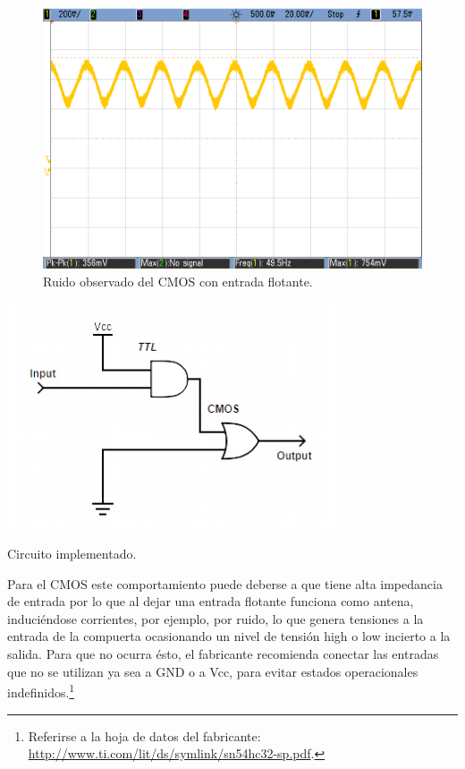 \begin{figure}[H]
    \centering
    \includegraphics[width=.5\linewidth]{./ruidoCMOS.png}
    \caption{Ruido observado del CMOS con entrada flotante.}
    \label{fig:ruidoCMOS}
\end{figure}

\vspace{20mm}
\begin{table}
    \begin{center}
        \includegraphics[scale=0.5]{./circuito.jpg}
        \caption{Circuito implementado.}
        \label{fig:circuito}
    \end{center}
\end{table} 
\par
Para el CMOS este comportamiento puede deberse a que tiene alta impedancia de entrada por lo que al dejar una entrada flotante
funciona como antena, induciéndose corrientes, por ejemplo, por ruido, lo que genera tensiones a la entrada de la compuerta
ocasionando un nivel de tensión high o low incierto a la salida.
Para que no ocurra ésto, el fabricante recomienda conectar las entradas que no se utilizan ya sea a GND o a Vcc, 
para evitar estados operacionales indefinidos.\footnote{Referirse a la hoja de datos del fabricante: \url{http://www.ti.com/lit/ds/symlink/sn54hc32-sp.pdf}.}\\\newline

